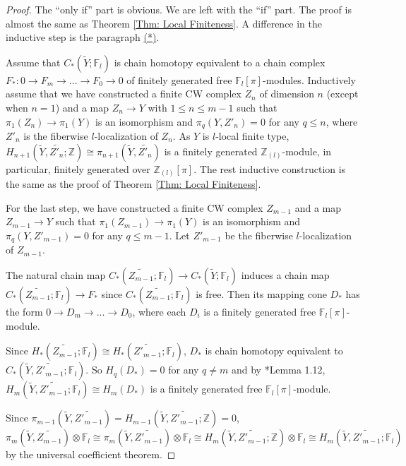 \documentclass[11pt]{amsart}
\theoremstyle{definition}
\numberwithin{equation}{section}
\numberwithin{equation}{section}
\newcommand\ZZ{\mathbb{Z}}
\newcommand\FF{\mathbb{F}}
\begin{document}
\begin{proof}
The ``only if'' part is obvious. We are left with the ``if'' part. The proof is almost the same as Theorem \ref{Thm: Local Finiteness}. A difference in the inductive step is the paragraph \hyperlink{Technical-Point}{(*)}. 

Assume that $C_*(\widetilde{Y};\FF_l)$ is chain homotopy equivalent to a chain complex $F_*:0\rightarrow F_m\rightarrow ...\rightarrow F_0\rightarrow 0$ of finitely generated free $\FF_l[\pi]$-modules. Inductively assume that we have constructed a finite CW complex $Z_n$ of dimension $n$ (except when $n=1$) and a map $Z_n \rightarrow Y$ with $1\leq n\leq m-1$ such that $\pi_1(Z_n)\rightarrow \pi_1(Y)$ is an isomorphism and $\pi_q(Y,Z'_n)=0$ for any $q\leq n$, where $Z'_n$ is the fiberwise $l$-localization of $Z_n$. As $Y$ is $l$-local finite type, $H_{n+1}(\widetilde{Y},\widetilde{Z'_n};\ZZ)\cong \pi_{n+1}(\widetilde{Y},\widetilde{Z'_n})$ is a finitely generated $\ZZ_{(l)}$-module, in particular, finitely generated over $\ZZ_{(l)}[\pi]$. The rest inductive construction is the same as the proof of Theorem \ref{Thm: Local Finiteness}.

For the last step, we have constructed a finite CW complex $Z_{m-1}$ and a map $Z_{m-1}\rightarrow Y$ such that $\pi_1(Z_{m-1})\rightarrow \pi_1(Y)$ is an isomorphism and $\pi_q(Y,Z'_{m-1})=0$ for any $q\leq m-1$. Let $Z'_{m-1}$ be the fiberwise $l$-localization of $Z_{m-1}$.

The natural chain map $C_*(\widetilde{Z_{m-1}};\FF_l)\rightarrow C_*(\widetilde{Y};\FF_l)$ induces a chain map $C_*(\widetilde{Z_{m-1}};\FF_l)\rightarrow F_*$ since $C_*(\widetilde{Z_{m-1}};\FF_l)$ is free. Then its mapping cone $D_*$ has the form $0\rightarrow D_m\rightarrow ...\rightarrow D_0$, where each $D_i$ is a finitely generated free $\FF_l[\pi]$-module.

Since $H_*(\widetilde{Z_{m-1}};\FF_l)\cong H_*(\widetilde{Z'_{m-1}};\FF_l)$, $D_*$ is chain homotopy equivalent to $C_*(\widetilde{Y},\widetilde{Z'_{m-1}};\FF_l)$. So $H_q(D_*)=0$ for any $q\neq m$ and by \cite{pedersen2017wallsfinitenessobstruction}*{Lemma 1.12}, $H_m(\widetilde{Y},\widetilde{Z'_{m-1}};\FF_l)\cong H_m(D_*)$ is a finitely generated free $\FF_l[\pi]$-module. 

Since $\pi_{m-1}(\widetilde{Y},\widetilde{Z'_{m-1}})=H_{m-1}(\widetilde{Y},\widetilde{Z'_{m-1}};\ZZ)=0$, $\pi_m(\widetilde{Y},\widetilde{Z_{m-1}})\otimes \FF_l\cong \pi_m(\widetilde{Y},\widetilde{Z'_{m-1}})\otimes \FF_l\cong H_m(\widetilde{Y},\widetilde{Z'_{m-1}};\ZZ)\otimes \FF_l\cong H_m(\widetilde{Y},\widetilde{Z'_{m-1}};\FF_l)$ by the universal coefficient theorem.


\end{proof}
\end{document}
